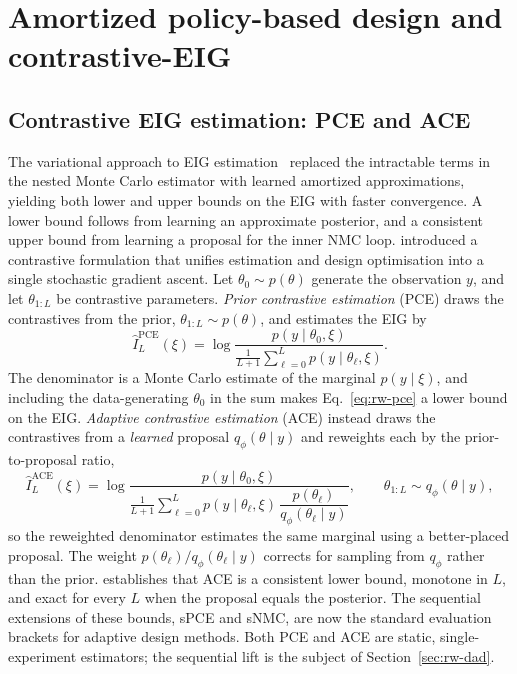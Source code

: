 \section{Amortized policy-based design and contrastive-EIG}
\label{sec:rw-policy}

\subsection{Contrastive EIG estimation: PCE and ACE}
\label{sec:rw-contrastive}

The variational approach to EIG estimation~\citep{foster2019variational} replaced the intractable terms in the nested Monte Carlo estimator with learned amortized approximations, yielding both lower and upper bounds on the EIG with faster convergence. A lower bound follows from learning an approximate posterior, and a consistent upper bound from learning a proposal for the inner NMC loop. \citet{foster2020unified} introduced a contrastive formulation that unifies estimation and design optimisation into a single stochastic gradient ascent. Let $\theta_0\sim p(\theta)$ generate the observation $y$, and let $\theta_{1:L}$ be contrastive parameters. \emph{Prior contrastive estimation} (PCE) draws the contrastives from the prior, $\theta_{1:L}\sim p(\theta)$, and estimates the EIG by
  \begin{equation}
  \label{eq:rw-pce}
  \hat I^{\mathrm{PCE}}_L(\xi)
  =\log\frac{p(y\mid\theta_0,\xi)}{\frac{1}{L+1}\sum_{\ell=0}^{L}
  p(y\mid\theta_\ell,\xi)} .
  \end{equation}
The denominator is a Monte Carlo estimate of the marginal $p(y\mid\xi)$, and including the data-generating $\theta_0$ in the sum makes Eq.~\eqref{eq:rw-pce} a lower bound on the EIG. \emph{Adaptive contrastive estimation} (ACE) instead draws the contrastives from a \emph{learned} proposal $q_\phi(\theta\mid y)$ and reweights each by the prior-to-proposal ratio,
  \begin{equation}
  \label{eq:rw-ace}
  \hat I^{\mathrm{ACE}}_L(\xi)
  =\log\frac{p(y\mid\theta_0,\xi)}{\frac{1}{L+1}\sum_{\ell=0}^{L}
  p(y\mid\theta_\ell,\xi)\,\dfrac{p(\theta_\ell)}{q_\phi(\theta_\ell
  \mid y)}},
  \qquad \theta_{1:L}\sim q_\phi(\theta\mid y),
  \end{equation}
so the reweighted denominator estimates the same marginal using a better-placed proposal. The weight $p(\theta_\ell)/q_\phi(\theta_\ell\mid y)$ corrects for sampling from $q_\phi$ rather than the prior. \citet{foster2020unified} establishes that ACE is a consistent lower bound, monotone in $L$, and exact for every $L$ when the proposal equals the posterior. The sequential extensions of these bounds, sPCE and sNMC, are now the standard evaluation brackets for adaptive design methods. Both PCE and ACE are static, single-experiment estimators; the sequential lift is the subject of Section~\ref{sec:rw-dad}.

